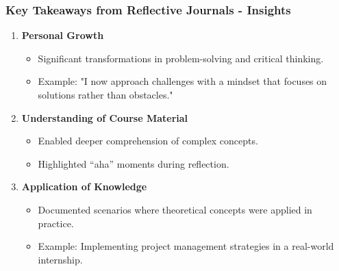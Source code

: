 \documentclass{beamer}
\begin{document}
\begin{frame}[fragile]
    \frametitle{Key Takeaways from Reflective Journals - Insights}
    \begin{enumerate}
        \item \textbf{Personal Growth}
            \begin{itemize}
                \item Significant transformations in problem-solving and critical thinking.
                \item Example: "I now approach challenges with a mindset that focuses on solutions rather than obstacles."
            \end{itemize}
        \item \textbf{Understanding of Course Material}
            \begin{itemize}
                \item Enabled deeper comprehension of complex concepts.
                \item Highlighted “aha” moments during reflection.
            \end{itemize}
        \item \textbf{Application of Knowledge}
            \begin{itemize}
                \item Documented scenarios where theoretical concepts were applied in practice.
                \item Example: Implementing project management strategies in a real-world internship.
            \end{itemize}
    \end{enumerate}
\end{frame}
\end{document}
